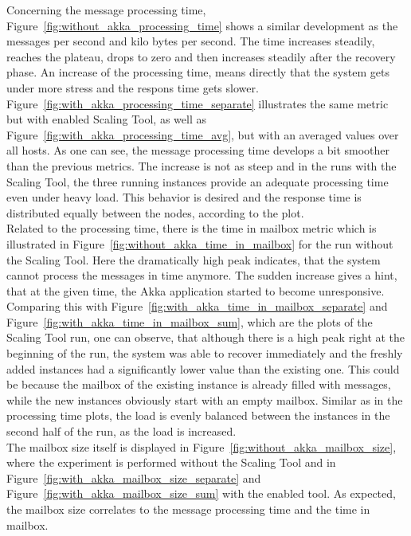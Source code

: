 Concerning the message processing time, Figure~\ref{fig:without_akka_processing_time} shows a similar development as the messages per second and kilo bytes per second.
The time increases steadily, reaches the plateau, drops to zero and then increases steadily after the recovery phase.
An increase of the processing time, means directly that the system gets under more stress and the respons time gets slower.\\
Figure~\ref{fig:with_akka_processing_time_separate} illustrates the same metric but with enabled Scaling Tool, as well as Figure~\ref{fig:with_akka_processing_time_avg}, but with an averaged values over all hosts.
As one can see, the message processing time develops a bit smoother than the previous metrics.
The increase is not as steep and in the runs with the Scaling Tool, the three running instances provide an adequate processing time even under heavy load.
This behavior is desired and the response time is distributed equally between the nodes, according to the plot.\\

Related to the processing time, there is the time in mailbox metric which is illustrated in Figure~\ref{fig:without_akka_time_in_mailbox} for the run without the Scaling Tool.
Here the dramatically high peak indicates, that the system cannot process the messages in time anymore.
The sudden increase gives a hint, that at the given time, the Akka application started to become unresponsive.
Comparing this with Figure~\ref{fig:with_akka_time_in_mailbox_separate} and Figure~\ref{fig:with_akka_time_in_mailbox_sum}, which are the plots of the Scaling Tool run, one can observe, that although there is a high peak right at the beginning of the run, the system was able to recover immediately and the freshly added instances had a significantly lower value than the existing one.
This could be because the mailbox of the existing instance is already filled with messages, while the new instances obviously start with an empty mailbox.
Similar as in the processing time plots, the load is evenly balanced between the instances in the second half of the run, as the load is increased.\\
The mailbox size itself is displayed in Figure~\ref{fig:without_akka_mailbox_size}, where the experiment is performed without the Scaling Tool and in Figure~\ref{fig:with_akka_mailbox_size_separate} and Figure~\ref{fig:with_akka_mailbox_size_sum} with the enabled tool.
As expected, the mailbox size correlates to the message processing time and the time in mailbox.



